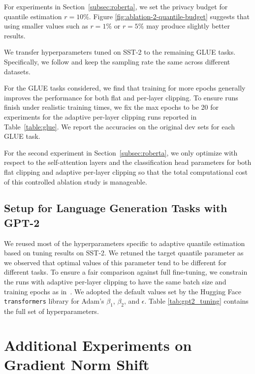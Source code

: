 For experiments in Section~\ref{subsec:roberta}, we set the privacy budget for quantile estimation $r=10\%$. 
Figure \ref{fig:ablation-2-quantile-budget} suggests that using smaller values such as $r=1\%$ or $r=5\%$ may produce slightly better results.

We transfer hyperparameters tuned on SST-2 to the remaining GLUE tasks. Specifically, we follow \cite{li2022large} and keep the sampling rate the same across different datasets. 

For the GLUE tasks considered, we find that training for more epochs generally improves the performance for both flat and per-layer clipping. 
To ensure runs finish under realistic training times, we fix the max epochs to be 20 for experiments for the adaptive per-layer clipping runs reported in Table~\ref{table:glue}. 
We report the accuracies on the original dev sets for each GLUE task.

For the second experiment in Section~\ref{subsec:roberta}, we only optimize with respect to the self-attention layers and the classification head parameters for both flat clipping and adaptive per-layer clipping so that the total computational cost of this controlled ablation study is manageable.



\subsection{Setup for Language Generation Tasks with GPT-2} \label{app:lang_gen}

We reused most of the hyperparameters specific to adaptive quantile estimation based on tuning results on SST-2. 
We retuned the target quantile parameter as we observed that optimal values of this parameter tend to be different for different tasks. 
To ensure a fair comparison against full fine-tuning, we constrain the runs with adaptive per-layer clipping to have the same batch size and training epochs as in~\citep{li2022large}. 
We adopted the default values set by the Hugging Face \texttt{transformers}  library for Adam's $\beta_1$, $\beta_2$, and $\epsilon$. 
Table \ref{tab:gpt2_tuning} contains the full set of hyperparameters. 




\section{Additional Experiments on Gradient Norm Shift}\label{app:gradnorm-shift}

